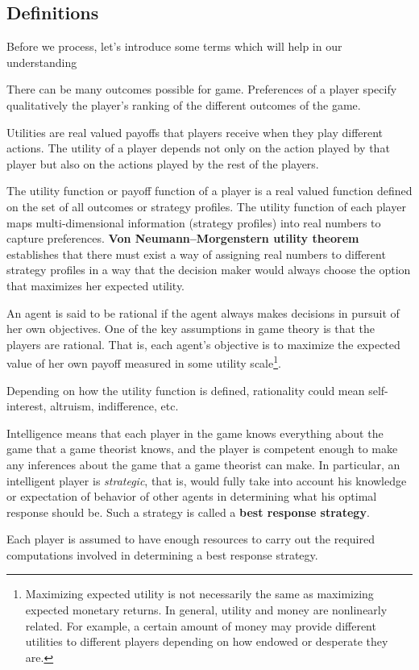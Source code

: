 \subsection{Definitions}
Before we process, let's introduce some terms which will help in our understanding
\begin{defn}[Preferences]
    There can be many outcomes possible for game.
    Preferences of a player specify qualitatively the player's ranking of the different outcomes of the game.
\end{defn}
\begin{defn}[Utilities]
    Utilities are real valued payoffs that players receive when they play different actions.
    The utility of a player depends not only on the action played by that player but also on the actions played by the rest of the players.
\end{defn}
\begin{defn}
    The utility function or payoff function of a player is a real valued function defined on the set of all outcomes or strategy profiles.
    The utility function of each player maps multi-dimensional information (strategy profiles) into real numbers to capture preferences.
    \textbf{Von Neumann–Morgenstern utility theorem} establishes that there must exist a way of assigning real numbers to different strategy profiles in a way that the decision maker would always choose the option that maximizes her expected utility.
\end{defn}
\begin{defn}[Rationality]
    An agent is said to be rational if the agent always makes decisions in pursuit of her own objectives. One of the key assumptions in game theory is that the players are rational. That is, each agent’s objective is to maximize the expected value of her own payoff measured in some utility scale\footnote{Maximizing expected utility is not necessarily the same as maximizing expected
monetary returns.
In general, utility and money are nonlinearly related.
For example, a certain amount of money may provide different utilities to different players depending on how endowed or desperate they are.}.
    \begin{note}
       Depending on how the utility function is defined, rationality could mean self-interest, altruism, indifference, etc.
    \end{note}
\end{defn}
\begin{defn}[Intelligence]
    Intelligence means that each player in the game knows everything about the game that a game theorist knows, and the player is competent enough to make any inferences about the game that a game theorist can make.
    In particular, an intelligent player is \emph{strategic}, that is, would fully take into account his knowledge or expectation of behavior of other agents in determining what his optimal response should be.
    Such a strategy is called a \textbf{best response strategy}.
    \begin{note}
        Each player is assumed to have enough resources to carry out the required computations involved in determining a best response strategy.
    \end{note}
\end{defn}
